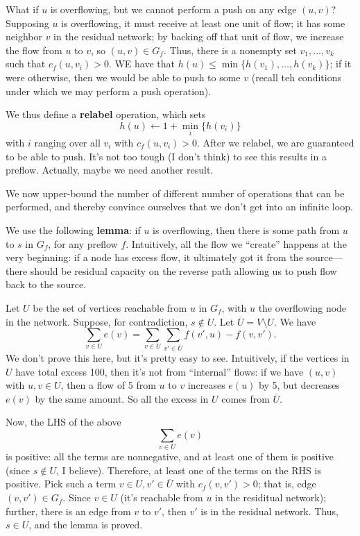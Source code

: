 \documentclass{article}
\begin{document}
What if $u$ is overflowing, but we cannot perform a push on any edge $(u,v)$?
Supposing $u$ is overflowing, it must receive at least one unit of flow;
it has some neighbor $v$ in the residual network; by backing off that unit
of flow, we increase the flow from $u$ to $v$, so $(u,v)\in G_f$.
Thus, there is a nonempty set $v_1,\ldots,v_k$ such that $c_f(u,v_i) > 0$.
WE have that $h(u) \leq \min\{h(v_1),\ldots,h(v_k)\}$; if it were otherwise,
then we would be able to push to some $v$ (recall teh conditions under which
we may perform a push operation).

We thus define a \textbf{relabel} operation, which sets 
$$
h(u) \gets
1 + \min_i\{h(v_i)\}
$$
with $i$ ranging over all $v_i$ with $c_f(u,v_i) > 0$.
After we relabel, we are guaranteed to be able to push.
It's not too tough (I don't think) to see this results in a preflow.
Actually, maybe we need another result.

We now upper-bound the number of different number of operations that can
be performed, and thereby convince ourselves that we don't get into
an infinite loop.

We use the following \textbf{lemma}: if $u$ is overflowing, then there is
some path from $u$ to $s$ in $G_f$, for any preflow $f$.
Intuitively, all the flow we ``create'' happens at the very beginning: if
a node has excess flow, it ultimately got it from the source---there should
be residual capacity on the reverse path allowing us to push flow back
to the source.

Let $U$ be the set of vertices reachable from $u$ in $G_f$, with $u$
the overflowing node in the network.
Suppose, for contradiction, $s\not\in U$.
Let $\overline U = V\setminus U$.
We have
$$
\sum_{v\in U} e(v) = 
\sum_{v\in U}
\sum_{v'\in\overline U}
f(v',u) - f(v,v').
$$
We don't prove this here, but it's pretty easy to see.
Intuitively, if the vertices in $U$ have total excess 100, then it's not
from ``internal'' flows: if we have $(u,v)$ with $u,v\in U$, then a flow
of 5 from $u$ to $v$ increases $e(u)$ by 5, but decreases $e(v)$ by the
same amount.
So all the excess in $U$ comes from $\overline U$.

Now, the LHS of the above
$$
\sum_{v\in U} e(v)
$$
is positive: all the terms are nonnegative, and at least one of them
is positive (since $s\not\in U$, I believe).
Therefore, at least one of the terms on the RHS is positive.
Pick such a term $v\in U, v'\in\overline U$ with $c_f(v,v') > 0$;
that is, edge $(v,v')\in G_f$.
Since $v\in U$ (it's reachable from $u$ in the residitual network); further,
there is an edge from $v$ to $v'$, then $v'$ is in the residual network.
Thus, $s\in U$, and the lemma is proved.
\end{document}
